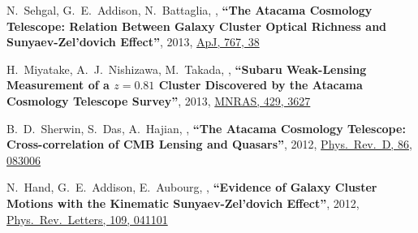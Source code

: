 \documentclass{article}
\def\myself{\textbf{\color{red} C.~Sif\'on}}
\def\apj{ApJ}
\def\mnras{MNRAS}
\def\prd{Phys.\ Rev.\ D}
\def\prl{Phys.\ Rev.\ Letters}
\begin{document}
\begin{etaremune}
\item
N.~Sehgal, G.~E.~Addison, N.~Battaglia, ,
\textbf{``The Atacama Cosmology Telescope: Relation Between Galaxy Cluster Optical Richness and
Sunyaev-Zel'dovich Effect''},
2013, \href{http://adsabs.harvard.edu/adsabs/abs/2013ApJ...767...38S}{\apj, 767, 38}

\item
H.~Miyatake, A.~J.~Nishizawa, M.~Takada, ,
\textbf{``Subaru Weak-Lensing Measurement of a $z=0.81$ Cluster Discovered by the Atacama Cosmology
Telescope Survey''},
2013, \href{http://adsabs.harvard.edu/adsabs/abs/2013MNRAS.429.3627M}{\mnras, 429, 3627}

\item
B.~D.~Sherwin, S.~Das, A.~Hajian, ,
\textbf{``The Atacama Cosmology Telescope: Cross-correlation of CMB Lensing and Quasars''},
2012, \href{http://adsabs.harvard.edu/adsabs/abs/2012PhRvD..86h3006S}{\prd, 86, 083006}

\item 
N.~Hand, G.~E.~Addison, E.~Aubourg,  ,
\textbf{``Evidence of Galaxy Cluster Motions with the Kinematic Sunyaev-Zel'dovich Effect''}, 
2012, \href{http://adsabs.harvard.edu/adsabs/abs/2012PhRvL.109d1101H}{\prl, 109, 041101}


\end{etaremune}
\end{document}
